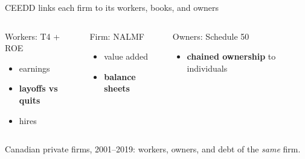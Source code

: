 \documentclass[aspectratio=169,11pt]{beamer}
\newlength{\safezone}
\newcommand{\hl}[1]{{\color{WarmAmber}\bfseries #1}}
\begin{document}
\begin{frame}[label=data]{CEEDD links each firm to its workers, books, and owners}
  \vspace{6pt}
  \begin{columns}[T,onlytextwidth]
    \begin{cardbox}{Workers: T4 + ROE}
      \begin{itemize}
        \item earnings
        \item \hl{layoffs vs quits}
        \item hires
      \end{itemize}
    \end{cardbox}
    \begin{cardbox}{Firm: NALMF}
      \begin{itemize}
        \item value added
        \item \hl{balance sheets}
      \end{itemize}
    \end{cardbox}
    \begin{cardbox}{Owners: Schedule 50}
      \begin{itemize}
        \item \hl{chained ownership} to individuals
      \end{itemize}
    \end{cardbox}
  \end{columns}

  \vspace{10pt}
  \begin{keybox}
    Canadian private firms, 2001--2019: workers, owners, and debt of the \emph{same} firm.
  \end{keybox}
  \vfill
  \hfill\hyperlink{datamap}{}\hspace{\safezone}
\end{frame}
\end{document}
